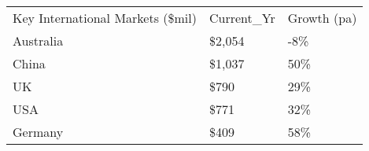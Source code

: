 \begin{tabular}[t]{p{5.4cm}p{0.9cm}p{1.2cm}}
 Key International Markets (\$mil) & Current\_Yr & Growth (pa) \\ 
 Australia & \$2,054 & -8\% \\ 
  China & \$1,037 & 50\% \\ 
  UK & \$790   & 29\% \\ 
  USA & \$771   & 32\% \\ 
  Germany & \$409   & 58\% \\ 
  \end{tabular}
